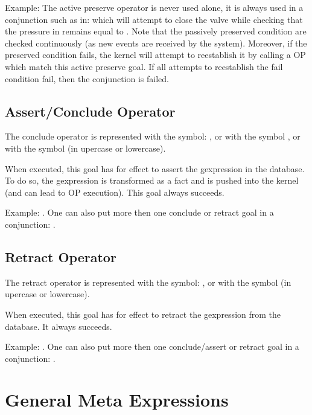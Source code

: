 Example: The active preserve operator is never used alone, it is always used in a
conjunction such as in:  which will attempt to close the valve while checking that the pressure
in  remains equal to . Note that the passively preserved
condition are checked continuously (as new events are received by the system).
Moreover, if the preserved condition fails, the kernel will attempt to
reestablish it by calling a OP which match this active preserve goal. If all
attempts to reestablish the fail condition fail, then the conjunction is failed.

\subsection{Assert/Conclude Operator}

The conclude operator is represented with the symbol: \samp{=>}, or with the
symbol , or with the symbol  (in upercase or
lowercase).

When executed, this goal has for effect to assert the gexpression in the
database. To do so, the gexpression is transformed as a fact and is pushed
into the kernel (and can lead to OP execution). This goal always succeeds.

Example: . One can also put more then one
conclude or retract goal in a conjunction: .

\subsection{Retract Operator}

The retract operator is represented with the symbol: \samp{~>}, or with the
symbol  (in upercase or lowercase).

When executed, this goal has for effect to retract the gexpression from the
database. It always succeeds.


Example: . One can also put more then one
conclude/assert or retract goal in a conjunction: .

\section{General Meta Expressions}

